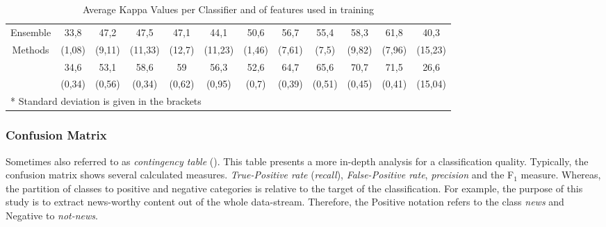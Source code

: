 \begin{table}[H]
{\begin{tabular}{c|ccccc | ccccc | c}
				\vspace*{-2mm}
				Ensemble & 33,8 & 47,2 & 47,5 & 47,1 & 44,1 & 50,6 & 56,7 & 55,4 & 58,3 & 61,8 & 40,3 \\
				Methods & (1,08) & (9,11) & (11,33) & (12,7) & (11,23) & (1,46) & (7,61) & (7,5) & (9,82) & (7,96) & (15,23) \\
				\vspace*{-2mm}
				\multirow{2}{*}{Vote} & 34,6 & 53,1 & 58,6 & 59 & 56,3 & 52,6 & 64,7 & 65,6 & 70,7 & 71,5 & 26,6 \\
					& (0,34) & (0,56) & (0,34) & (0,62) & (0,95) & (0,7) & (0,39) & (0,51) & (0,45) & (0,41) & (15,04) \\
				\hline\hline	
				\multicolumn{11}{l}{* Standard deviation is given in the brackets}\\			
			\end{tabular}
			}
			\captionsetup{width=0.8\textwidth}
			\caption[Average Kappa Values]{Average Kappa Values per Classifier and \textnumero of features used in training}
			\label{tab:kappa}%
		\end{table}%
		
		\subsubsection{Confusion Matrix}		
		Sometimes also referred to as \textit{contingency table} (\cite{fawcett2006roc}). This table presents a more in-depth analysis for a classification quality. Typically, the confusion matrix shows several calculated measures. \textit{True-Positive rate} (\textit{recall}), \textit{False-Positive rate}, \textit{precision} and the F$ _1 $ measure. Whereas, the partition of classes to positive and negative categories is relative to the target of the classification. For example, the purpose of this study is to extract news-worthy content out of the whole data-stream. Therefore, the Positive notation refers to the class \textit{news} and Negative to \textit{not-news}. 
		

